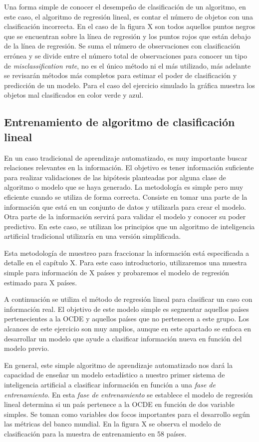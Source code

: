 \documentclass[letterpaper,12pt, spanish, oneside]{book} %
\begin{document}
Una forma simple de conocer el desempeño de clasificación de un algoritmo, en este caso, el algoritmo de regresión lineal, es contar el número de objetos con una clasificación incorrecta. En el caso de la figura X son todos aquellos puntos negros que se encuentran sobre la línea de regresión y los puntos rojos que están debajo de la línea de regresión. Se suma el número de observaciones con clasificación errónea y se divide entre el número total de observaciones para conocer un tipo de  \textit{misclassification rate}, no es el único método ni el más utilizado, más adelante se revisarán métodos más completos para estimar el poder de clasificación y predicción de un modelo. Para el caso del ejercicio simulado la gráfica muestra los objetos mal clasificados en color verde y azul.

\subsection{Entrenamiento de algoritmo de clasificación lineal}

En un caso tradicional de aprendizaje automatizado, es muy importante buscar relaciones relevantes en la información. El objetivo es tener información suficiente para realizar validaciones de las hipótesis planteadas por alguna clase de algoritmo o modelo que se haya generado. La metodología es simple pero muy eficiente cuando se utiliza de forma correcta. Consiste en tomar una parte de la información que está en un conjunto de datos y utilizarla para crear el modelo. Otra parte de la información servirá para validar el modelo y conocer su poder predictivo. En este caso, se utilizan los principios que un algoritmo de inteligencia artificial tradicional utilizaría en una versión simplificada.

Esta metodología de muestreo para fraccionar la información está especificada a detalle en el capítulo X. Para este caso introductorio, utilizaremos una muestra simple para información de X países y probaremos el modelo de regresión estimado para X países. 

A continuación se utiliza el método de regresión lineal para clasificar un caso con información real. El objetivo de este modelo simple es segmentar aquellos países pertenecientes a la OCDE y aquellos países que no pertenecen a este grupo. Los alcances de este ejercicio son muy amplios, aunque en este apartado se enfoca en desarrollar un modelo que ayude a clasificar información nueva en función del modelo previo. 

En general, este simple algoritmo de aprendizaje automatizado nos dará la capacidad de enseñar un modelo estadístico a nuestro primer sistema de inteligencia artificial a clasificar información en función a una \textit{fase de entrenamiento}. En esta \textit{fase de entrenamiento} se establece el modelo de regresión lineal determina si un país pertenece a la OCDE en función de dos variable simples. Se toman como variables dos focos importantes para el desarrollo según las métricas del banco mundial. En la figura X se observa el modelo de clasificación para la muestra de entrenamiento en 58 países.
\end{document}
